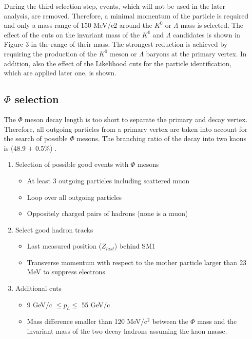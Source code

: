 During the third selection step, events, which will not be used in the later analysis, are removed. Therefore, a minimal momentum of the particle is required and only a mass range of 150 MeV/c2 around the $K^0$ or $\Lambda$ mass is selected. The effect of the cuts on the invariant mass of the $K^0$ and $\Lambda$ candidates is shown in Figure 3 in the range of their mass. The strongest reduction is achieved by requiring the production of the $K^0$ meson or $\Lambda$ baryons at the primary vertex.
In addition, also the effect of the Likelihood cuts for the particle identification, which are applied later one, is shown.

\subsection{$\Phi$ selection}

The $\Phi$ meson decay length is too short to separate the primary and decay vertex. Therefore, all outgoing particles from a primary vertex are taken into account for the search of possible $\Phi$ mesons. The branching ratio of the decay into two kaons is (48.9 $\pm$ 0.5\%) \cite{}.

\begin{enumerate}
  \item Selection of possible good events with $\Phi$ mesons
  \begin{itemize}
    \item At least 3 outgoing particles including scattered muon
    \item Loop over all outgoing particles
    \item Oppositely charged pairs of hadrons (none is a muon)
  \end{itemize}
  \item Select good hadron tracks
  \begin{itemize}
    \item Last measured position ($Z_{last}$) behind SM1
    \item Transverse momentum with respect to the mother particle larger than 23 MeV to suppress electrons
  \end{itemize}
  \item Additional cuts
  \begin{itemize}
    \item 9 GeV/c $\leq p_h \leq$ 55 GeV/c
    \item Mass difference smaller than 120 MeV/c$^2$ between the $\Phi$ mass and the invariant mass of the two decay hadrons assuming the kaon masse.
  \end{itemize}
\end{enumerate}

